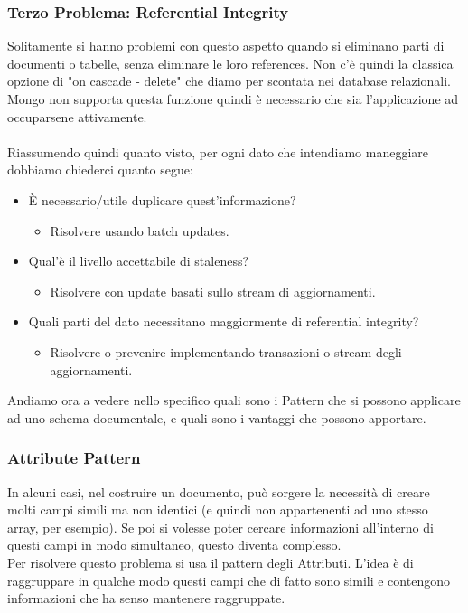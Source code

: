 \subsubsection{Terzo Problema: Referential Integrity}
Solitamente si hanno problemi con questo aspetto quando si eliminano parti di documenti o tabelle, senza eliminare le loro references. Non c'è quindi la classica opzione di "on cascade - delete" che diamo per scontata nei database relazionali. Mongo non supporta questa funzione quindi è necessario che sia l'applicazione ad occuparsene attivamente.\\\\

\noindent Riassumendo quindi quanto visto, per ogni dato che intendiamo maneggiare dobbiamo chiederci quanto segue:
\begin{itemize}
    \item È necessario/utile duplicare quest'informazione?
    \begin{itemize}
        \item Risolvere usando batch updates.
    \end{itemize}
    \item Qual'è il livello accettabile di staleness?
    \begin{itemize}
        \item Risolvere con update basati sullo stream di aggiornamenti.
    \end{itemize}
    \item Quali parti del dato necessitano maggiormente di referential integrity?
    \begin{itemize}
        \item Risolvere o prevenire implementando transazioni o stream degli aggiornamenti.
    \end{itemize}
\end{itemize}

\noindent Andiamo ora a vedere nello specifico quali sono i Pattern che si possono applicare ad uno schema documentale, e quali sono i vantaggi che possono apportare.

\subsubsection{Attribute Pattern}
In alcuni casi, nel costruire un documento, può sorgere la necessità di creare molti campi simili ma non identici (e quindi non appartenenti ad uno stesso array, per esempio). Se poi si volesse poter cercare informazioni all'interno di questi campi in modo simultaneo, questo diventa complesso.\\
Per risolvere questo problema si usa il pattern degli Attributi. L'idea è di raggruppare in qualche modo questi campi che di fatto sono simili e contengono informazioni che ha senso mantenere raggruppate.\\

